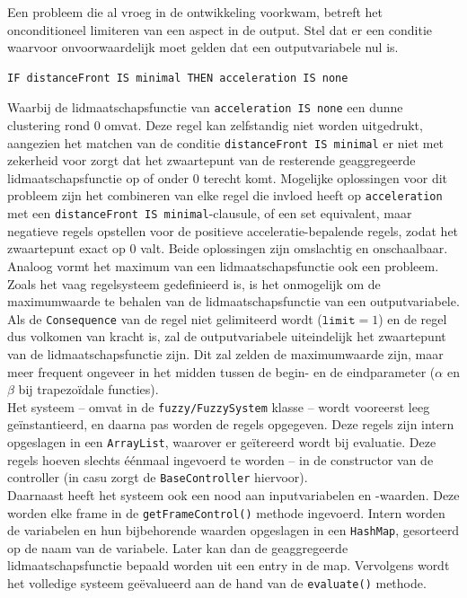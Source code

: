 \documentclass[10pt,a4paper]{article}
\begin{document}
		Een probleem die al vroeg in de ontwikkeling voorkwam, betreft het onconditioneel limiteren van een aspect in de output. Stel dat er een conditie waarvoor onvoorwaardelijk moet gelden dat een outputvariabele nul is.

		\begin{lstlisting}
IF distanceFront IS minimal THEN acceleration IS none
		\end{lstlisting}

		Waarbij de lidmaatschapsfunctie van \texttt{acceleration IS none} een dunne clustering rond $0$ omvat. Deze regel kan zelfstandig niet worden uitgedrukt, aangezien het matchen van de conditie \texttt{distanceFront IS minimal} er niet met zekerheid voor zorgt dat het zwaartepunt van de resterende geaggregeerde lidmaatschapsfunctie op of onder $0$ terecht komt. Mogelijke oplossingen voor dit probleem zijn het combineren van elke regel die invloed heeft op \texttt{acceleration} met een \texttt{distanceFront IS minimal}-clausule, of een set equivalent, maar negatieve regels opstellen voor de positieve acceleratie-bepalende regels, zodat het zwaartepunt exact op $0$ valt. Beide oplossingen zijn omslachtig en onschaalbaar.\\

		Analoog vormt het maximum van een lidmaatschapsfunctie ook een probleem. Zoals het vaag regelsysteem gedefinieerd is, is het onmogelijk om de maximumwaarde te behalen van de lidmaatschapsfunctie van een outputvariabele. Als de \texttt{Consequence} van de regel niet gelimiteerd wordt ($\texttt{limit} = 1$) en de regel dus volkomen van kracht is, zal de outputvariabele uiteindelijk het zwaartepunt van de lidmaatschapsfunctie zijn. Dit zal zelden de maximumwaarde zijn, maar meer frequent ongeveer in het midden tussen de begin- en de eindparameter ($\alpha$ en $\beta$ bij trapezo\"idale functies).\\

		Het systeem -- omvat in de \texttt{fuzzy/FuzzySystem} klasse -- wordt vooreerst leeg ge\"instantieerd, en daarna pas worden de regels opgegeven. Deze regels zijn intern opgeslagen in een \texttt{ArrayList}, waarover er ge\"itereerd wordt bij evaluatie. Deze regels hoeven slechts \'e\'enmaal ingevoerd te worden -- in de constructor van de controller (in casu zorgt de \texttt{BaseController} hiervoor).\\

		Daarnaast heeft het systeem ook een nood aan inputvariabelen en -waarden. Deze worden elke frame in de \texttt{getFrameControl()} methode ingevoerd. Intern worden de variabelen en hun bijbehorende waarden opgeslagen in een \texttt{HashMap}, gesorteerd op de naam van de variabele. Later kan dan de geaggregeerde lidmaatschapsfunctie bepaald worden uit een entry in de map. Vervolgens wordt het volledige systeem ge\"evalueerd aan de hand van de \texttt{evaluate()} methode.\\
\end{document}
